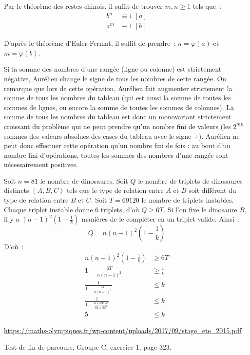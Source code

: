 \begin{sol}
Par le théorème des restes chinois, il suffit de trouver $m, n \geq 1$ tels que~:
\begin{align*}
    b^n &\equiv 1 \; [a] \\
    a^m &\equiv 1 \; [b]
\end{align*}

D'après le théorème d'Euler-Fermat, il suffit de prendre~: $n = \varphi(a)$ et $m = \varphi(b)$.
\end{sol}


\begin{sol}
Si la somme des nombres d'une rangée (ligne ou colonne) est strictement négative, Aurélien change le signe de tous les nombres de cette rangée. On remarque que lors de cette opération, Aurélien fait augmenter strictement la somme de tous les nombres du tableau (qui est aussi la somme de toutes les sommes de lignes, ou encore la somme de toutes les sommes de colonnes). La somme de tous les nombres du tableau est donc un monovariant strictement croissant du problème qui ne peut prendre qu'un nombre fini de valeurs (les $2^{mn}$ sommes des valeurs absolues des cases du tableau avec le signe $\pm$). Aurélien ne peut donc effectuer cette opération qu'un nombre fini de fois : au bout d'un nombre fini d'opérations, toutes les sommes des nombres d'une rangée sont nécessairement positives.
\end{sol}

\begin{sol}
Soit $n = 81$ le nombre de dinosaures.
Soit $Q$ le nombre de triplets de dinosaures distincts $(A, B, C)$ tels que le type de relation entre $A$ et $B$ soit différent du type de relation entre $B$ et $C$.
Soit $T = 69120$ le nombre de triplets instables. Chaque triplet instable donne $6$ triplets, d'où $Q \geq 6T$.
Si l'on fixe le dinosaure $B$, il y a $(n - 1)^2 \left (1 - \frac{1}{k}\right )$ manières de le compléter en un triplet valide.
Ainsi~:
$$Q = n(n - 1)^2 \left (1 - \frac{1}{k}\right )$$
D'où~:
\begin{align*}
    n(n - 1)^2 \left (1 - \frac{1}{k}\right ) &\geq 6T \\
    1 - \frac{6T}{n(n - 1)^2} &\geq \frac{1}{k} \\
    \frac{1}{1 - \frac{6T}{n(n - 1)^2}} &\leq k \\
    \frac{1}{1 - \frac{6\times 69120}{81\times80^2}} &\leq k \\
    5 &\leq k
\end{align*}
\end{sol}


\begin{sol}
\url{https://maths-olympiques.fr/wp-content/uploads/2017/09/stage_ete_2015.pdf}

Test de fin de parcours, Groupe C, exercice 1, page 323.
\end{sol}